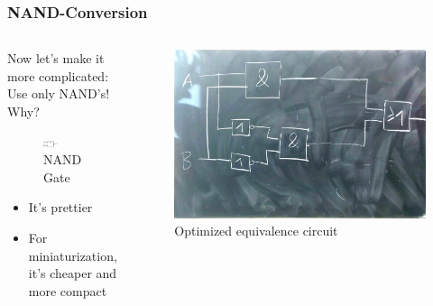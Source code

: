 \documentclass{beamer}
\begin{document}
\begin{frame} \frametitle{NAND-Conversion}
  \begin{columns}
  \begin{column}{5cm}
  Now let's make it more complicated: \newline Use only NAND's! Why?
      \begin{figure}[H]
      \includegraphics[width=0.35\textwidth]{nand}%
      \caption{NAND Gate}%
      \label{fig:nand}
    \end{figure}
  \begin{itemize}
   \item<2-> It's prettier
   \item<3-> For miniaturization, it's cheaper and more compact
  \end{itemize}

  \end{column}
  
  \begin{column}{6cm}
    \begin{figure}[H]
      \centering
      \includegraphics[width=1\textwidth]{eq1}%
      \caption{Optimized equivalence circuit}%
      \label{fig:equivalence_optimized}
    \end{figure}
  \end{column}
  \end{columns}  
\end{frame}
\end{document}
